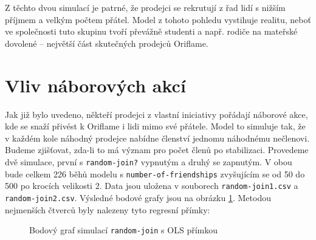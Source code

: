 \documentclass[a4wide,12pt]{report}
\begin{document}
Z těchto dvou simulací je patrné, že prodejci se rekrutují z řad lidí s nižším příjmem a velkým počtem přátel. Model z tohoto pohledu vystihuje realitu, neboť ve společnosti tuto skupinu tvoří převážně studenti a např. rodiče na mateřské dovolené -- největší část skutečných prodejců Oriflame.
\section{Vliv náborových akcí}
Jak již bylo uvedeno, někteří prodejci z vlastní iniciativy pořádají náborové akce, kde se snaží přivést k Oriflame i lidi mimo své přátele. Model to simuluje tak, že v každém kole náhodný prodejce nabídne členství jednomu náhodnému nečlenovi. Budeme zjišťovat, zda-li to má význam pro počet členů po stabilizaci. Provedeme dvě simulace, první s \texttt{random-join?} vypnutým a druhý se zapnutým. V obou bude celkem 226 běhů modelu s \texttt{number-of-friendships} zvyšujícím se od 50 do 500 po krocích velikosti 2. Data jsou uložena v souborech \texttt{random-join1.csv} a \texttt{random-join2.csv}. Výsledné bodové grafy jsou na obrázku \ref{fig:random-join}. Metodou nejmenších čtverců byly nalezeny tyto regresní přímky:
\begin{figure}[h]
  \centering
  \caption{Bodový graf simulací \texttt{random-join} s OLS přímkou}
  \label{fig:random-join}
\end{figure}
\end{document}
